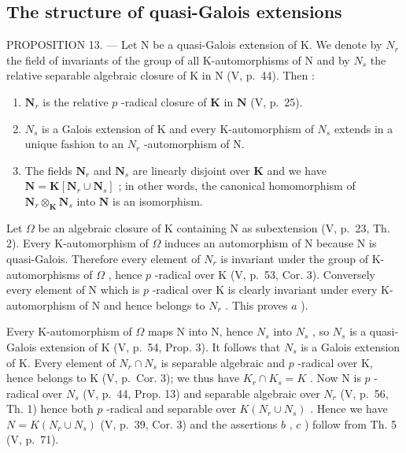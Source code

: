 \subsection{The structure of quasi-Galois extensions}

PROPOSITION 13. --- Let N be a quasi-Galois extension of K. We denote by \(N_{r}\) the field of invariants of the group of all K-automorphisms of N and by \(N_{s}\) the relative separable algebraic closure of K in N (V, p.~44). Then :

\begin{enumerate}
\def\labelenumi{\alph{enumi})}
\item
  \(\mathbf{N}_r\) is the relative \(p\) -radical closure of \(\mathbf{K}\) in \(\mathbf{N}\) (V, p.~25).
\item
  \(N_{s}\) is a Galois extension of K and every K-automorphism of \(N_{s}\) extends in a unique fashion to an \(N_{r}\) -automorphism of N.
\item
  The fields \(\mathbf{N}_r\) and \(\mathbf{N}_s\) are linearly disjoint over \(\mathbf{K}\) and we have \(\mathbf{N} = \mathbf{K}[\mathbf{N}_r \cup \mathbf{N}_s]\) ; in other words, the canonical homomorphism of \(\mathbf{N}_r \otimes_{\mathbf{K}} \mathbf{N}_s\) into \(\mathbf{N}\) is an isomorphism.
\end{enumerate}

Let \(\Omega\) be an algebraic closure of K containing N as subextension (V, p.~23, Th. 2). Every K-automorphism of \(\Omega\) induces an automorphism of N because N is quasi-Galois. Therefore every element of \(N_r\) is invariant under the group of K-automorphisms of \(\Omega\) , hence \(p\) -radical over K (V, p.~53, Cor. 3). Conversely every element of N which is \(p\) -radical over K is clearly invariant under every K-automorphism of N and hence belongs to \(N_r\) . This proves \(a\) ).

Every K-automorphism of \(\Omega\) maps N into N, hence \(N_s\) into \(N_s\) , so \(N_s\) is a quasi-Galois extension of K (V, p.~54, Prop. 3). It follows that \(N_s\) is a Galois extension of K. Every element of \(N_r \cap N_s\) is separable algebraic and \(p\) -radical over K, hence belongs to K (V, p.~Cor. 3); we thus have \(K_r \cap K_s = K\) . Now N is \(p\) -radical over \(N_s\) (V, p.~44, Prop. 13) and separable algebraic over \(N_r\) (V, p.~56, Th. 1) hence both \(p\) -radical and separable over \(K(N_r \cup N_s)\) . Hence we have \(N = K(N_r \cup N_s)\) (V, p.~39, Cor. 3) and the assertions \(b\) , \(c\) ) follow from Th. 5 (V, p.~71).

